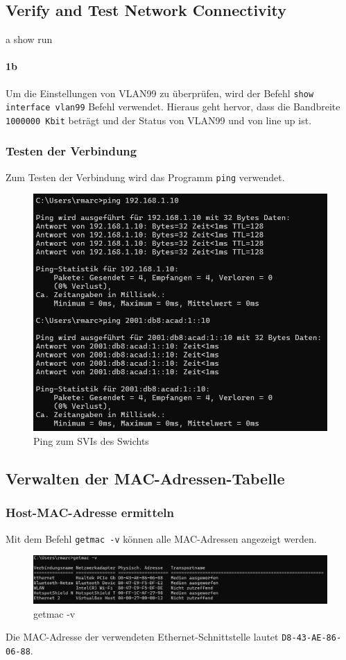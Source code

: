 \documentclass[a4paper]{article}
\newcommand{\abc}{\hfill \break}
\begin{document}
\subsection{Verify and Test Network Connectivity} \abc
a
show run
\paragraph {1b} \abc
Um die Einstellungen von VLAN99 zu überprüfen, wird der Befehl \texttt{show interface vlan99} Befehl verwendet.
Hieraus geht hervor, dass die Bandbreite \texttt{1000000 Kbit} beträgt und der Status von VLAN99 und von line up ist.
\newpage
\subsubsection{Testen der Verbindung}\abc
Zum Testen der Verbindung wird das Programm \texttt{ping} verwendet.
\begin{figure}[h]
	\centering
	\includegraphics[scale=0.4]{images/ping.png}
	\caption{Ping zum SVIs des Swichts}
\end{figure}

\subsection{Verwalten der MAC-Adressen-Tabelle}
\subsubsection{Host-MAC-Adresse ermitteln}
Mit dem Befehl \texttt{getmac -v} können alle MAC-Adressen angezeigt werden.
\begin{figure}[h]
	\centering
	\includegraphics[scale=0.3]{images/getmac.png}
	\caption{getmac -v}
\end{figure}
Die MAC-Adresse der verwendeten Ethernet-Schnittstelle lautet \texttt{D8-43-AE-86-06-88}.
\end{document}

